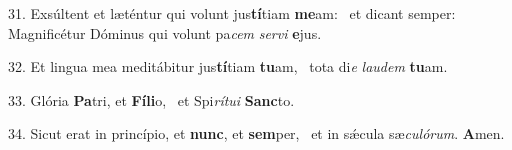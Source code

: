 31. Exsúltent et læténtur qui volunt jus\textbf{tí}tiam \textbf{me}am: \ast\  et dicant semper: Magnificétur Dóminus qui volunt pa\textit{cem} \textit{ser}\textit{vi} \textbf{e}jus.\

32. Et lingua mea meditábitur jus\textbf{tí}tiam \textbf{tu}am, \ast\  tota di\textit{e} \textit{lau}\textit{dem} \textbf{tu}am.\

33. Glória \textbf{Pa}tri, et \textbf{Fí}\textbf{li}o, \ast\  et Spi\textit{rí}\textit{tu}\textit{i} \textbf{Sanc}to.\

34. Sicut erat in princípio, et \textbf{nunc}, et \textbf{sem}per, \ast\  et in sǽcula sæ\textit{cu}\textit{ló}\textit{rum}. \textbf{A}men.\

